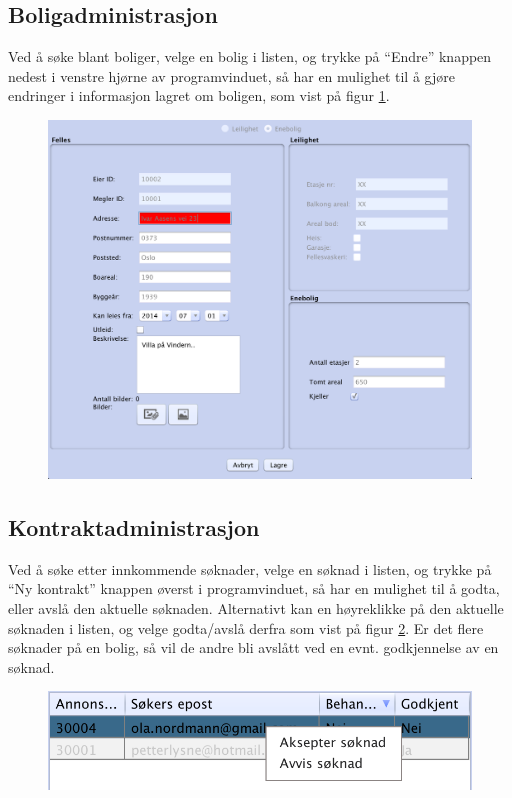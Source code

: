 \newpage
\subsection{Boligadministrasjon}
Ved å søke blant boliger, velge en bolig i listen, og trykke på “Endre” knappen nedest i venstre
hjørne av programvinduet, så har en mulighet til å gjøre endringer i informasjon lagret om boligen,
som vist på figur \ref{fig:bv:13}.

\begin{figure}[h!]
 \includegraphics[width=\textwidth,height=\textheight,keepaspectratio]{./img/brukerveiledning/13.png}
 \caption{}
 \label{fig:bv:13}
\end{figure}


\newpage
\subsection{Kontraktadministrasjon}
Ved å søke etter innkommende søknader, velge en søknad i listen, og trykke på “Ny kontrakt”
knappen øverst i programvinduet, så har en mulighet til å godta, eller avslå den aktuelle søknaden.
Alternativt kan en høyreklikke på den aktuelle søknaden i listen, og velge godta/avslå derfra som
vist på figur \ref{fig:bv:14}. Er det flere søknader på en bolig, så vil de andre bli avslått ved en evnt.
godkjennelse av en søknad.

\begin{figure}[h!]
\center
 \includegraphics[scale=0.5]{./img/brukerveiledning/14.png}
 \caption{}
 \label{fig:bv:14}
\end{figure}



